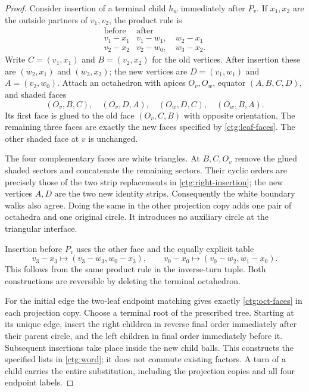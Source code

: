 \documentclass[11pt]{article}
\numberwithin{equation}{section}
\theoremstyle{definition}
\theoremstyle{remark}
\begin{document}
\begin{proof}
Consider insertion of a terminal child $h_w$ immediately after $P_v$.
If $x_1,x_2$ are the outside partners of $v_1,v_2$, the product rule is
\begin{equation}\label{ctg:right-insertion}
\begin{array}{c|c}
 \text{before}&\text{after}\\\hline
 v_1-x_1&v_1-w_1,\quad w_2-x_1\\
 v_2-x_2&v_2-w_0,\quad w_3-x_2.
\end{array}
\end{equation}
Write $C=(v_1,x_1)$ and $B=(v_2,x_2)$ for the old vertices. After
insertion these are $(w_2,x_1)$ and $(w_3,x_2)$; the new vertices are
$D=(v_1,w_1)$ and $A=(v_2,w_0)$. Attach an octahedron with apices
$O_v,O_w$, equator $(A,B,C,D)$, and shaded faces
\begin{equation}\label{ctg:oct-faces}
 (O_v,B,C),\quad (O_v,D,A),\quad (O_w,D,C),\quad (O_w,B,A).
\end{equation}
Its first face is glued to the old face $(O_v,C,B)$ with opposite
orientation. The remaining three faces are exactly the new faces
specified by \eqref{ctg:leaf-faces}. The other shaded face at $v$
is unchanged.

The four complementary faces are white triangles. At $B,C,O_v$ remove
the glued shaded sectors and concatenate the remaining sectors.
Their cyclic orders are precisely those of the two strip replacements
in \eqref{ctg:right-insertion}; the new vertices $A,D$ are the two
new identity strips. Consequently the white boundary walks also agree.
Doing the same in the other projection copy adds one pair of
octahedra and one original circle. It introduces no auxiliary circle
at the triangular interface.

Insertion before $P_v$ uses the other face and the equally explicit
table
\begin{equation}\label{ctg:left-insertion}
 v_3-x_3\longmapsto(v_3-w_3,w_0-x_3),\qquad
 v_0-x_0\longmapsto(v_0-w_2,w_1-x_0).
\end{equation}
This follows from the same product rule in the inverse-turn tuple.
Both constructions are reversible by deleting the terminal octahedron.

For the initial edge the two-leaf endpoint matching gives exactly
\eqref{ctg:oct-faces} in each projection copy. Choose a terminal root
of the prescribed tree. Starting at its unique edge, insert the right
children in reverse final order immediately after their parent circle,
and the left children in final order immediately before it. Subsequent
insertions take place inside the new child balls. This constructs the
specified lists in \eqref{ctg:word}; it does not commute existing
factors. A turn of a child carries the entire substitution, including
the projection copies and all four endpoint labels.


\end{proof}
\end{document}
